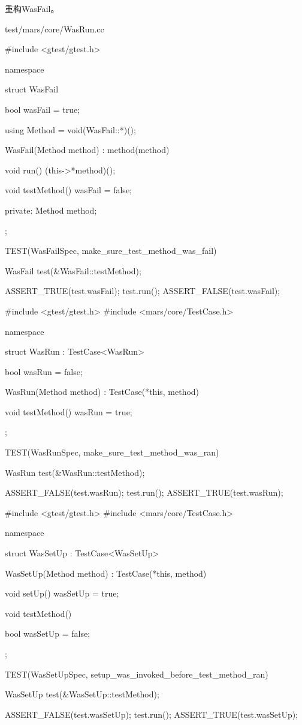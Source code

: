 重构WasFail。

\begin{diff}{test/mars/core/WasRun.cc}
\begin{minicpp}
#include <gtest/gtest.h>

namespace {
  struct WasFail {
    bool wasFail = true;

    using Method = void(WasFail::*)();

    WasFail(Method method) : method(method) {
    }

    void run() {
      (this->*method)();
    }

    void testMethod() {
      wasFail = false;
    }

  private:
    Method method;
  };
}

TEST(WasFailSpec, make_sure_test_method_was_fail) {
  WasFail test(&WasFail::testMethod);

  ASSERT_TRUE(test.wasFail);
  test.run();
  ASSERT_FALSE(test.wasFail);
}
\end{minicpp}
\tcblower
\begin{minicpp}
#include <gtest/gtest.h>
#include <mars/core/TestCase.h>

namespace {
  struct WasRun : TestCase<WasRun> {
    bool wasRun = false;

    WasRun(Method method) : TestCase(*this, method) {
    }

    void testMethod() {
      wasRun = true;
    }
  };
}

TEST(WasRunSpec, make_sure_test_method_was_ran) {
  WasRun test(&WasRun::testMethod);

  ASSERT_FALSE(test.wasRun);
  test.run();
  ASSERT_TRUE(test.wasRun);
}
\end{minicpp}
\end{diff}


\begin{nodiff}
\begin{c++}
#include <gtest/gtest.h>
#include <mars/core/TestCase.h>

namespace {
  struct WasSetUp : TestCase<WasSetUp> {
    WasSetUp(Method method) : TestCase(*this, method) {
    }

    void setUp() {
      wasSetUp = true;
    }

    void testMethod() {
    }

    bool wasSetUp = false;
  };
}

TEST(WasSetUpSpec, setup_was_invoked_before_test_method_ran) {
  WasSetUp test(&WasSetUp::testMethod);

  ASSERT_FALSE(test.wasSetUp);
  test.run();
  ASSERT_TRUE(test.wasSetUp);
}
\end{c++}
\end{nodiff}



